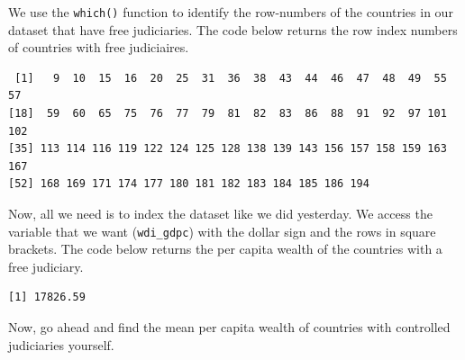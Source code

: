 \documentclass[]{article}
\newenvironment{Shaded}{\begin{snugshade}}{\end{snugshade}}
\newcommand{\DataTypeTok}[1]{\textcolor[rgb]{0.13,0.29,0.53}{#1}}
\newcommand{\DecValTok}[1]{\textcolor[rgb]{0.00,0.00,0.81}{#1}}
\newcommand{\KeywordTok}[1]{\textcolor[rgb]{0.13,0.29,0.53}{\textbf{#1}}}
\newcommand{\NormalTok}[1]{#1}
\newcommand{\OperatorTok}[1]{\textcolor[rgb]{0.81,0.36,0.00}{\textbf{#1}}}
\newcommand{\OtherTok}[1]{\textcolor[rgb]{0.56,0.35,0.01}{#1}}
\newcommand{\StringTok}[1]{\textcolor[rgb]{0.31,0.60,0.02}{#1}}
\begin{document}
We use the \texttt{which()} function to identify the row-numbers of the countries in our dataset that have free judiciaries. The code below returns the row index numbers of countries with free judiciaires.

\begin{Shaded}
\end{Shaded}

\begin{verbatim}
 [1]   9  10  15  16  20  25  31  36  38  43  44  46  47  48  49  55  57
[18]  59  60  65  75  76  77  79  81  82  83  86  88  91  92  97 101 102
[35] 113 114 116 119 122 124 125 128 138 139 143 156 157 158 159 163 167
[52] 168 169 171 174 177 180 181 182 183 184 185 186 194
\end{verbatim}

Now, all we need is to index the dataset like we did yesterday. We access the variable that we want (\texttt{wdi\_gdpc}) with the dollar sign and the rows in square brackets. The code below returns the per capita wealth of the countries with a free judiciary.

\begin{Shaded}
\end{Shaded}

\begin{verbatim}
[1] 17826.59
\end{verbatim}

Now, go ahead and find the mean per capita wealth of countries with controlled judiciaries yourself.

\begin{Shaded}
\end{Shaded}
\end{document}
